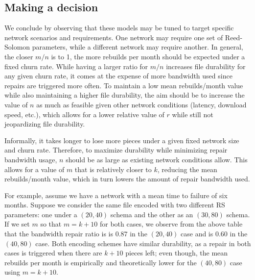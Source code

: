 \subsection{Making a decision}

We conclude by observing that these models may be tuned to target specific network scenarios and requirements. One network may require one set of Reed-Solomon parameters, while a different network may require another. In general, the closer $m/n$ is to 1, the more rebuilds per month should be expected under a fixed churn rate. While having a larger ratio for $m/n$ increases file durability for any given churn rate, it comes at the expense of more bandwidth used since repairs are triggered more often. To maintain a low mean rebuilds/month value while also maintaining a higher file durability, the aim should be to increase the value of $n$ as much as feasible given other network conditions (latency, download speed, etc.), which allows for a lower relative value of $r$ while still not jeopardizing file durability. 

Informally, it takes longer to lose more pieces under a given fixed network size and churn rate. Therefore, to maximize durability while minimizing repair bandwidth usage, $n$ should be as large as existing network conditions allow. This allows for a value of $m$ that is relatively closer to $k$, reducing the mean rebuilds/month value, which in turn lowers the amount of repair bandwidth used. 

For example, assume we have a network with a mean time to failure of six months.
Suppose we consider the same file encoded with two different RS parameters: 
one under a $(20,40)$ schema and the other as an $(30,80)$ schema. If we set $m$ so that $m=k+10$ for both cases, we observe from the above table
that the bandwidth repair ratio is is $0.87$ in the $(20,40)$ case and is $0.60$ in the $(40,80)$ case. Both encoding schemes have similar durability, as a repair in both cases is triggered when there are $k+10$ pieces left; even though, the mean rebuilds per month 
is empirically and theoretically lower for the $(40,80)$ case using $m=k+10$. 